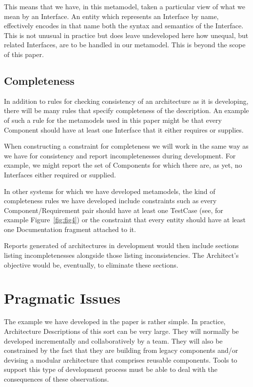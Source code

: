 \documentclass{llncs}
\begin{document}
This means that we have, in this metamodel, taken a particular view of what we mean by an Interface. An entity which represents an Interface by name, effectively encodes in that name both the syntax and semantics of the Interface. This is not unusual in practice but does leave undeveloped here how unequal, but related Interfaces, are to be handled in our metamodel. This is beyond the scope of this paper.

\subsection{Completeness}

\noindent In addition to rules for checking consistency of an architecture as it is developing, there will be many rules that specify completeness of the description. An example of such a rule for the metamodels used in this paper might be that every Component should have at least one Interface that it either requires or supplies.

When constructing a constraint for completeness we will work in the same way as we have for consistency and report incompletenesses during development. For example, we might report the set of Components for which there are, as yet, no Interfaces either required or supplied.

In other systems for which we have developed metamodels, the kind of 
completeness rules we have developed include constraints such as every Component/Requirement pair should have at least one TestCase (see, for example Figure~\ref{fig:fig4}) or the constraint that every entity should have at least one Documentation fragment attached to it. 

Reports generated of architectures in development would then include sections listing incompletenesses alongside those listing inconsistencies. The Architect's objective would be, eventually, to eliminate these sections.


\section{Pragmatic Issues}
\label{sec:pragmatics}
\noindent The example we have developed in the paper is rather simple. In practice, Architecture Descriptions of this sort can be very large. They will normally be developed incrementally and collaboratively by a team. They will also be constrained by the fact that they are building from legacy components and/or devising a modular architecture that comprises reusable components. Tools to support this type of development process must be able to deal with the consequences of these observations.
\end{document}

